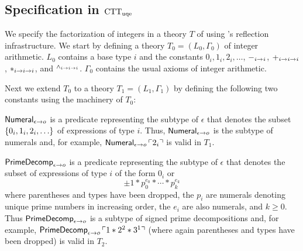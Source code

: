 \documentclass[fleqn]{llncs}
\begin{document}
\subsection{Specification in ${\rm CTT}_{\rm uqe}$}

We specify the factorization of integers in a theory $T$ of
{\churchuqe} using {\churchuqe}'s reflection infrastructure.  We start
by defining a theory $T_0 = (L_0,\Gamma_0)$ of integer arithmetic.
$L_0$ contains a base type $i$ and the constants $0_i, 1_i,
2_i,\ldots$, $-_{i \rightarrow i}$, $+_{i \rightarrow i \rightarrow i}$, $*_{i
  \rightarrow i \rightarrow i}$, and $\phantom{}^{{\wedge}_{i \rightarrow i
    \rightarrow i}}$.  $\Gamma_0$ contains the usual axioms of integer
arithmetic.

Next we extend $T_0$ to a theory $T_1 = (L_1,\Gamma_1)$ by defining 
the following two constants using the machinery of $T_0$:

\be

  \item $\mbox{\sf Numeral}_{\epsilon \rightarrow o}$ is a predicate
    representing the subtype of $\epsilon$ that denotes the subset
    ${\{ 0_i, 1_i, 2_i,\ldots \}}$ of expressions of type $i$.  Thus,
    $\mbox{\sf Numeral}_{\epsilon \rightarrow o}$ is the subtype of numerals
    and, for example, $\mbox{\sf Numeral}_{\epsilon \rightarrow o}\,
    \ulcorner2_i\urcorner$ is valid in $T_1$.

  \item $\mbox{\sf PrimeDecomp}_{\epsilon \rightarrow o}$ is a predicate
    representing the subtype of $\epsilon$ that denotes the subset of
    expressions of type $i$ of the form $0_i$ or \[\pm 1 * p_{0}^{e_0}
    * \cdots * p_{k}^{e_k}\] where parentheses and types have been
    dropped, the $p_i$ are numerals denoting unique prime numbers in
    increasing order, the $e_i$ are also numerals, and $k \ge 0$.
    Thus $\mbox{\sf PrimeDecomp}_{\epsilon \rightarrow o}$ is a subtype of
    signed prime decompositions and, for example,
    $\mbox{\sf PrimeDecomp}_{\epsilon \rightarrow o}\, \ulcorner1 * 2^2 *
      3^1\urcorner$ (where again parentheses and types have been dropped) is
    valid in $T_2$.

\ee
\end{document}
